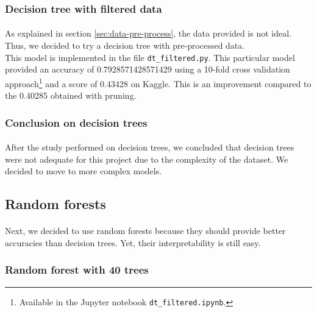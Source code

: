 \documentclass[a4paper, 11pt, oneside]{article}
\begin{document}
\subsubsection{Decision tree with filtered data} \label{subsubsec:dtFiltered}
\paragraph{}As explained in section \ref{sec:data-pre-process}, the data provided is not ideal. Thus, we decided to try a decision tree with pre-processed data.\\
This model is implemented in the file \texttt{dt\_filtered.py}. This particular model provided an accuracy of 0.7928571428571429 using a 10-fold cross validation approach\footnote{Available in the Jupyter notebook \texttt{dt\_filtered.ipynb}.} and a score of 0.43428 on Kaggle. This is an improvement compared to the 0.40285 obtained with pruning.

\subsubsection{Conclusion on decision trees}
\paragraph{}After the study performed on decision trees, we concluded that decision trees were not adequate for this project due to the complexity of the dataset. We decided to move to more complex models.


\subsection{Random forests}
\paragraph{}Next, we decided to use random forests because they should provide better accuracies than decision trees. Yet, their interpretability is still easy.

\subsubsection{Random forest with 40 trees} \label{subsubsec:rf40Trees}
\end{document}
